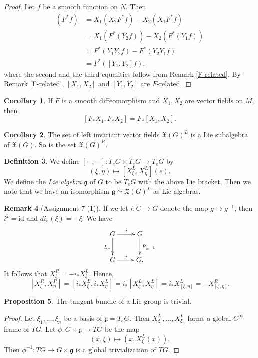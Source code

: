\documentclass{amsart}
\numberwithin{equation}{section}
\theoremstyle{definition}
\newtheorem{definition}{Definition} [section]
\newtheorem{remark}[definition]{Remark}
\theoremstyle{theorem}
\newtheorem{proposition}[definition]{Proposition}
\newtheorem{corollary}[definition]{Corollary}
\begin{document}
\begin{proof}
Let $f$ be a smooth function on $N$. Then  
\begin{align*}
[X_1, X_2] (F^*f) &= X_1(X_2 F^*f) - X_2(X_1F^*f) \\
&= X_1(F^*(Y_2f)) - X_2(F^*(Y_1f)) \\
&= F^*(Y_1Y_2f) - F^*(Y_2Y_1f) \\
&= F^*([Y_1,Y_2]f),
\end{align*}
where the second and the third equalities follow from Remark \ref{F-related}.
By Remark \ref{F-related}, $[X_1, X_2]$ and $[Y_1, Y_2]$ are $F$-related. 
\end{proof}

\begin{corollary}
If $F$ is a smooth diffeomorphism and $X_1, X_2$ are vector fields on $M$, then 
\[
[F_*X_1, F_*X_2] = F_*[X_1, X_2].
\]
\end{corollary}

\begin{corollary}
The set of left invariant vector fields $\mathfrak{X}(G)^L$ is a Lie subalgebra of $\mathfrak{X}(G)$. 
So is the set $\mathfrak{X}(G)^R$. 
\end{corollary}



\begin{definition}
We define $[-,-] : T_eG \times T_eG \to T_eG$ by 
\[
(\xi, \eta) \mapsto [X_\xi^L, X_\eta^L](e).
\]
We define the {\em Lie algebra} $\mathfrak{g}$ of $G$ to be $T_eG$ with the above Lie bracket. 
Then we note that we have an isomorphism $\mathfrak{g} \simeq \mathfrak{X}(G)^L$ as Lie algebras. 
\end{definition}

\begin{remark}[Assignment 7 (1)]
If we let $i : G \to G$ denote the map $g \mapsto g^{-1}$, then $i^2 = \text{id}$ and $di_e(\xi) = -\xi$. We have 
\[
\xymatrix{
G \ar[r]^i \ar[d]_{L_a}& G\ar[d]^{R_{a^{-1}}} \\
G \ar[r]^i & G.
}
\]
It follows that $X_\xi^R = -i_*X_\xi^L$. Hence,
\[
[X_\xi^R, X_\eta^R] = [i_*X_\xi^L, i_*X_\eta^L]  = i_*[X_\xi^L, X_\eta^L] = i_*X_{[\xi,\eta]}^L = - X_{[\xi, \eta]}^R.
\]
\end{remark}

\begin{proposition}\label{TG}
The tangent bundle of a Lie group is trivial. 
\end{proposition}

\begin{proof}
Let $\xi_1, \ldots, \xi_n$ be a basis of $\mathfrak{g} = T_eG$. Then $X_{\xi_1}^L, \ldots, X_{\xi_n}^L$ forms a global $C^\infty$ frame of $TG$.
Let $\phi: G \times \mathfrak{g} \to TG$ be the map 
\[
(x,\xi) \mapsto (x, X_\xi^L(x)).
\]
Then $\phi^{-1}: TG\to G\times \mathfrak{g}$ is a global trivialization of $TG$.
\end{proof}
\end{document}
